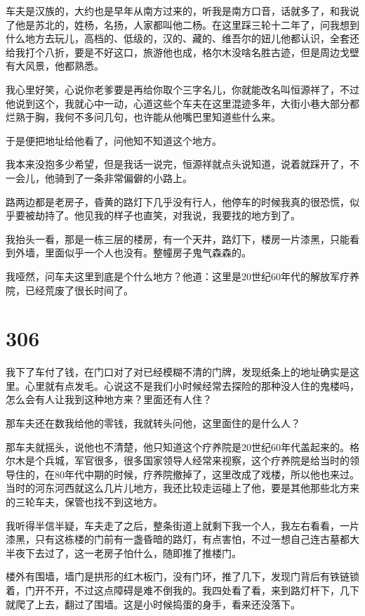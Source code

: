 车夫是汉族的，大约也是早年从南方过来的，听我是南方口音，话就多了，和我说了他是苏北的，姓杨，名扬，人家都叫他二杨。在这里踩三轮十二年了，问我想到什么地方去玩儿，高档的、低级的，汉的、藏的、维吾尔的妞儿他都认识，全套还给我打个八折，要是不好这口，旅游他也成，格尔木没啥名胜古迹，但是周边戈壁有大风景，他都熟悉。

我心里好笑，心说你老爹要是再给你取个三字名儿，你就能改名叫恒源祥了，不过他说到这个，我就心中一动，心道这些个车夫在这里混迹多年，大街小巷大部分都烂熟于胸，我何不多问几句，也许能从他嘴巴里知道些什么来。

于是便把地址给他看了，问他知不知道这个地方。

我本来没抱多少希望，但是我话一说完，恒源祥就点头说知道，说着就踩开了，不一会儿，他骑到了一条非常偏僻的小路上。

路两边都是老房子，昏黄的路灯下几乎没有行人，他停车的时候我真的很恐慌，似乎要被劫持了。他见我的样子也直笑，对我说，我要找的地方到了。

我抬头一看，那是一栋三层的楼房，有一个天井，路灯下，楼房一片漆黑，只能看到外墙，里面似乎一个人也没有。整幢房子鬼气森森的。

我哑然，问车夫这里到底是个什么地方？他道：这里是20世纪60年代的解放军疗养院，已经荒废了很长时间了。

\chapter{306}

我下了车付了钱，在门口对了对已经模糊不清的门牌，发现纸条上的地址确实是这里。心里就有点发毛。心说这不是我们小时候经常去探险的那种没人住的鬼楼吗，怎么会有人让我到这种地方来？里面还有人住？

那车夫还在数我给他的零钱，我就转头问他，这里面住的是什么人？

那车夫就摇头，说他也不清楚，他只知道这个疗养院是20世纪60年代盖起来的。格尔木是个兵城，军官很多，很多国家领导人经常来视察，这个疗养院是给当时的领导住的，在80年代中期的时候，疗养院撤掉了，这里改成了戏楼，所以他也来过。当时的河东河西就这么几片儿地方，我还比较走运碰上了他，要是其他那些北方来的三轮车夫，保管也找不到这地方。

我听得半信半疑，车夫走了之后，整条街道上就剩下我一个人，我左右看看，一片漆黑，只有这栋楼的门前有一盏昏暗的路灯，有点害怕，不过一想自己连古墓都大半夜下去过了，这一老房子怕什么，随即推了推楼门。

楼外有围墙，墙门是拱形的红木板门，没有门环，推了几下，发现门背后有铁链锁着，门开不开，不过这点障碍是难不倒我的。我四处看了看，来到路灯杆下，几下就爬了上去，翻过了围墙。这是小时候捣蛋的身手，看来还没落下。

